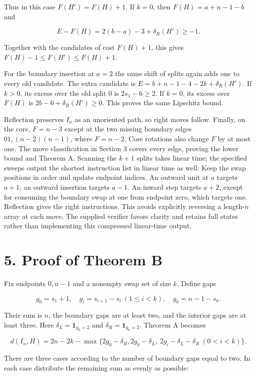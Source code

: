 \documentclass[11pt,a4paper]{article}
\begin{document}
Thus in this case \(F(H')=F(H)+1\). If \(k=0\), then \(F(H)=a+n-1-b\) and

\[ E-F(H)=2(b-a)-3+\delta_R(H')\ge-1. \]

Together with the candidates of cost \(F(H)+1\), this gives \(F(H)-1\le F(H')\le F(H)+1\).

For the boundary insertion at \(a=2\) the same shift of splits again adds one to every old candidate. The extra candidate is \(E=b+n-1-4-2k+\delta_R(H')\). If \(k>0\), its excess over the old split \(0\) is \(2s_1-6\ge2\). If \(k=0\), its excess over \(F(H)\) is \(2b-6+\delta_R(H')\ge0\). This proves the same Lipschitz bound.

Reflection preserves \(I_n\) as an unoriented path, so right moves follow. Finally, on the core, \(F=n-3\) except at the two missing boundary edges \(01,(n-2)(n-1)\), where \(F=n-2\). Core rotations also change \(F\) by at most one. The move classification in Section 3 covers every edge, proving the lower bound and Theorem A. Scanning the \(k+1\) splits takes linear time; the specified sweeps output the shortest instruction list in linear time as well. Keep the swap positions in order and update endpoint indices. An outward unit at \(a\) targets \(a+1\); an outward insertion targets \(a-1\). An inward step targets \(a+2\), except for consuming the boundary swap at one from endpoint zero, which targets one. Reflection gives the right instructions. This avoids explicitly reversing a length-\(n\) array at each move. The supplied verifier favors clarity and retains full states rather than implementing this compressed linear-time output.

\hypertarget{proof-of-theorem-b}{%
\section{5. Proof of Theorem B}\label{proof-of-theorem-b}}

Fix endpoints \(0,n-1\) and a nonempty swap set of size \(k\). Define gaps

\[ g_0=s_1+1,\quad g_i=s_{i+1}-s_i\ (1\le i<k),\quad
g_k=n-1-s_k. \]

Their sum is \(n\), the boundary gaps are at least two, and the interior gaps are at least three. Here \(\delta_L=\mathbf1_{g_0=2}\) and \(\delta_R=\mathbf1_{g_k=2}\). Theorem A becomes

\[ d(I_n,H)=2n-2k-\max\{2g_0-\delta_R,
2g_k-\delta_L,\ 2g_i-\delta_L-\delta_R\ (0<i<k)\}. \]

There are three cases according to the number of boundary gaps equal to two. In each case distribute the remaining sum as evenly as possible:
\end{document}
